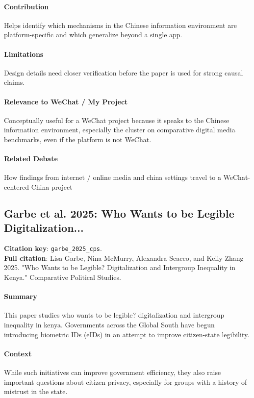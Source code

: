 \documentclass[12pt]{article}
\begin{document}
\paragraph{Contribution} Helps identify which mechanisms in the Chinese information environment are platform-specific and which generalize beyond a single app.

\paragraph{Limitations} Design details need closer verification before the paper is used for strong causal claims.

\paragraph{Relevance to WeChat / My Project} Conceptually useful for a WeChat project because it speaks to the Chinese information environment, especially the cluster on comparative digital media benchmarks, even if the platform is not WeChat.

\paragraph{Related Debate} How findings from internet / online media and china settings travel to a WeChat-centered China project


\subsection{Garbe et al. 2025: Who Wants to be Legible Digitalization...}
\textbf{Citation key}: \texttt{garbe\_2025\_cps}.\\
\textbf{Full citation}: Lisa Garbe, Nina McMurry, Alexandra Scacco, and Kelly Zhang 2025. "Who Wants to be Legible? Digitalization and Intergroup Inequality in Kenya." Comparative Political Studies.

\paragraph{Summary} This paper studies who wants to be legible? digitalization and intergroup inequality in kenya. Governments across the Global South have begun introducing biometric IDs (eIDs) in an attempt to improve citizen-state legibility.

\paragraph{Context} While such initiatives can improve government efficiency, they also raise important questions about citizen privacy, especially for groups with a history of mistrust in the state.
\end{document}
